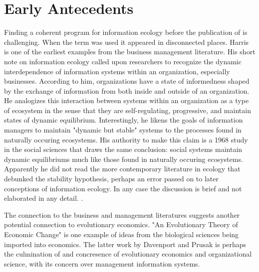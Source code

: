 \section{Early Antecedents}

Finding a coherent program for information ecology before the publication of \cite{nardi_information_1999, davenport_information_1997} is challenging. When the term was used it appeared in disconnected places. Harris is one of the earliest examples from the business management literature. His short note on information ecology called upon researchers to recognize the dynamic interdependence of information systems within an organization, especially businesses. According to him, organizations have a state of informedness shaped by the exchange of information from both inside and outside of an organization. He analogizes this interaction between systems within an organization as a type of ecosystem in the sense that they are self-regulating, progressive, and maintain states of dynamic equilibrium. Interestingly, he likens the goals of information managers to maintain "dynamic but stable" systems to the processes found in naturally occuring ecosystems. His authority to make this claim is a 1968 study in the social sciences that draws the same conclusion: social systems maintain dynamic equilibriums much like those found in naturally occuring ecosystems. Apparently he did not read the more contemporary literature in ecology that debunked the stability hypothesis, perhaps an error passed on to later conceptions of information ecology. In any case the discussion is brief and not elaborated in any detail. \cite{harris_information_1989}.

The connection to the business and management literatures suggests another potential connection to evolutionary economics. "An Evolutionary Theory of Economic Change" \cite{nelson_evolutionary_1985} is one example of ideas from the biological sciences being imported into economics. The latter work by Davenport and Prusak is perhaps the culmination of and concresence of evolutionary economics and organizational science, with its concern over management information systems.

